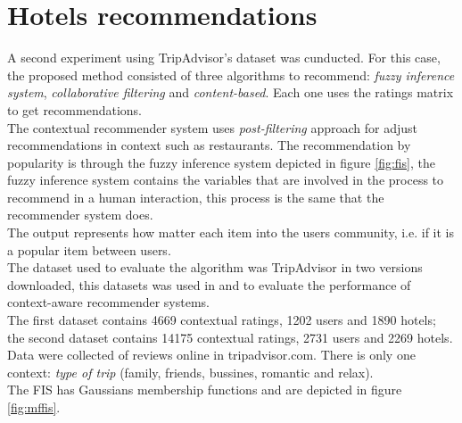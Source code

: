 \section{Hotels recommendations} \label{hotels}

A second experiment using TripAdvisor's dataset was cunducted. 
For this case, the proposed method consisted of three algorithms 
to recommend:  \textit{fuzzy inference system}, \textit{collaborative 
filtering} and \textit{content-based}. Each one uses the ratings 
matrix to get recommendations.\\    
The contextual recommender system uses  \textit{post-filtering}
approach\cite{adomavicius2011context} for adjust recommendations in
context such as restaurants. The recommendation by popularity is 
through the fuzzy inference system depicted in figure \ref{fig:fis}, 
the fuzzy inference
system contains the variables that are involved in the process to
recommend in a human interaction, this process is the same that the
recommender system does. \\The output represents how matter each item
into the users community, i.e. if it is a popular item between users. \\
The dataset used to evaluate the algorithm was TripAdvisor in two
versions downloaded\cite{linkzeng}, this datasets was used in
\cite{zheng2014context} and \cite{zheng2012differential} to  evaluate the
performance of context-aware recommender systems. \\The first
dataset contains 4669 contextual ratings, 1202 users and 1890 hotels;
the second dataset contains 14175 contextual ratings, 2731 users and
2269 hotels. Data were collected of reviews online in tripadvisor.com.
There is only one context: \textit{type of trip} (family, friends, bussines,
romantic and relax).\\ 
The FIS has Gaussians membership functions and are depicted in figure
\ref{fig:mffis}.
